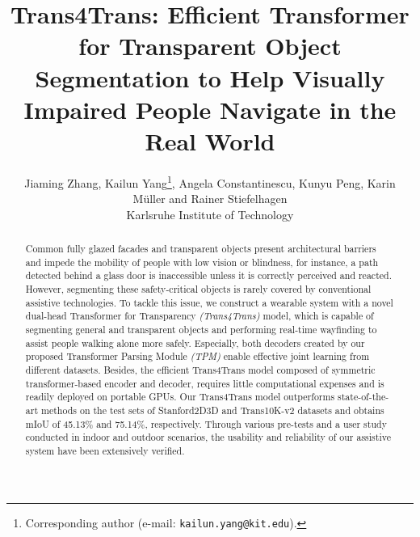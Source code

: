 \documentclass[10pt,twocolumn,letterpaper]{article}
\begin{document}
\title{Trans4Trans: Efficient Transformer for Transparent Object Segmentation to Help Visually Impaired People Navigate in the Real World}

\author{Jiaming Zhang, Kailun Yang\thanks{Corresponding author (e-mail: {\tt kailun.yang@kit.edu}).}, Angela Constantinescu, Kunyu Peng, Karin M\"uller and Rainer Stiefelhagen\\
Karlsruhe Institute of Technology
}

\maketitle
\ificcvfinal\thispagestyle{empty}\fi

\begin{abstract}
Common fully glazed facades and transparent objects present architectural barriers and impede the mobility of people with low vision or blindness, for instance, a path detected behind a glass door is inaccessible unless it is correctly perceived and reacted. However, segmenting these safety-critical objects is rarely covered by conventional assistive technologies. To tackle this issue, we construct a wearable system with a novel dual-head Transformer for Transparency \emph{(Trans4Trans)} model, which is capable of segmenting general and transparent objects and performing real-time wayfinding to assist people walking alone more safely. Especially, both decoders created by our proposed Transformer Parsing Module \emph{(TPM)} enable effective joint learning from different datasets. Besides, the efficient Trans4Trans model composed of symmetric transformer-based encoder and decoder, requires little computational expenses and is readily deployed on portable GPUs. Our Trans4Trans model outperforms state-of-the-art methods on the test sets of Stanford2D3D and Trans10K-v2 datasets and obtains mIoU of 45.13\% and 75.14\%, respectively. Through various pre-tests and a user study conducted in indoor and outdoor scenarios, the usability and reliability of our assistive system have been extensively verified.

\end{abstract}
\end{document}
